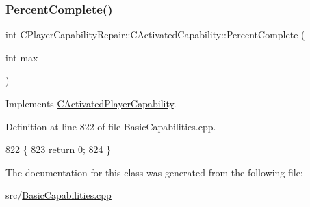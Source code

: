 \subsubsection{\texorpdfstring{Percent\+Complete()}{PercentComplete()}}
{\footnotesize\ttfamily int C\+Player\+Capability\+Repair\+::\+C\+Activated\+Capability\+::\+Percent\+Complete (\begin{DoxyParamCaption}\item[{int}]{max }\end{DoxyParamCaption})\hspace{0.3cm}{\ttfamily [virtual]}}



Implements \hyperlink{classCActivatedPlayerCapability_a405dc6076058006a4f801727de4cfe4d}{C\+Activated\+Player\+Capability}.



Definition at line 822 of file Basic\+Capabilities.\+cpp.


\begin{DoxyCode}
822                                                                        \{
823     \textcolor{keywordflow}{return} 0;
824 \}
\end{DoxyCode}


The documentation for this class was generated from the following file\+:\begin{DoxyCompactItemize}
\item 
src/\hyperlink{BasicCapabilities_8cpp}{Basic\+Capabilities.\+cpp}\end{DoxyCompactItemize}
